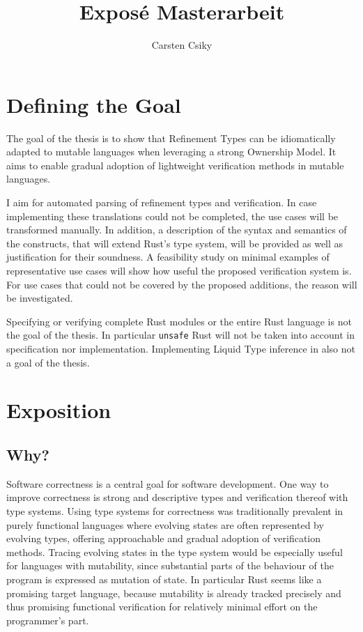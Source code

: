 \documentclass[11pt]{article}
\title{\textbf{Exposé Masterarbeit}}
\author{Carsten Csiky}
\date{}
\newcommand{\code}[1]{\texttt{#1}}
\begin{document}
\maketitle


\section{Defining the Goal}

The goal of the thesis is to show that Refinement Types can be idiomatically adapted to mutable languages when leveraging a strong Ownership Model. It aims to enable gradual adoption of lightweight verification methods in mutable languages.

I aim for automated parsing of refinement types and verification. 
In case implementing these translations could not be completed, the use cases will be transformed manually.
In addition, a description of the syntax and semantics of the constructs, that will extend Rust's type system, will be provided as well as justification for their soundness. A feasibility study on minimal examples of representative use cases will show how useful the proposed verification system is. For use cases that could not be covered by the proposed additions, the reason will be investigated.

Specifying or verifying complete Rust modules or the entire Rust language is not the goal of the thesis. In particular \code{unsafe} Rust will not be taken into account in specification nor implementation. Implementing Liquid Type inference in also not a goal of the thesis.


\section{Exposition}

\subsection{Why?}


Software correctness is a central goal for software development. One way to improve correctness is strong and descriptive types and verification thereof with type systems. Using type systems for correctness was traditionally prevalent in purely functional languages where evolving states are often represented by evolving types, offering approachable and gradual adoption of verification methods. Tracing evolving states in the type system would be especially useful for languages with mutability, since substantial parts of the behaviour of the program is expressed as mutation of state. In particular Rust seems like a promising target language, because mutability is already tracked precisely and thus promising functional verification for relatively minimal effort on the programmer's part.
\end{document}
